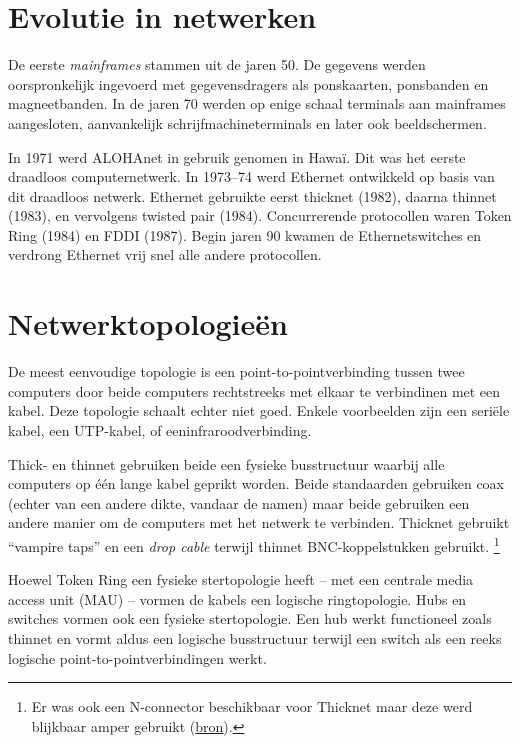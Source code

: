\section{Evolutie in netwerken}

De eerste \emph{mainframes} stammen uit de jaren 50.
De gegevens werden oorspronkelijk ingevoerd met gegevensdragers als ponskaarten, ponsbanden en magneetbanden.
In de jaren 70 werden op enige schaal terminals aan mainframes aangesloten, aanvankelijk schrijfmachineterminals en later ook beeldschermen.

In 1971 werd ALOHAnet in gebruik genomen in Hawaï.
Dit was het eerste draadloos computernetwerk.
In 1973--74 werd Ethernet ontwikkeld op basis van dit draadloos netwerk.
Ethernet gebruikte eerst thicknet (1982), daarna thinnet (1983), en vervolgens twisted pair (1984).
Concurrerende protocollen waren Token Ring (1984) en FDDI (1987).
Begin jaren 90 kwamen de Ethernetswitches en verdrong Ethernet vrij snel alle andere protocollen.



\section{Netwerktopologieën}

De meest eenvoudige topologie is een point-to-pointverbinding tussen twee computers door beide computers rechtstreeks met elkaar te verbindinen met een kabel.
Deze topologie schaalt echter niet goed.
Enkele voorbeelden zijn een seriële kabel, een UTP-kabel, of eeninfraroodverbinding.

Thick- en thinnet gebruiken beide een fysieke busstructuur waarbij alle computers op één lange kabel geprikt worden.
Beide standaarden gebruiken coax (echter van een andere dikte, vandaar de namen) maar beide gebruiken een andere manier om de computers met het netwerk te verbinden.
Thicknet gebruikt ``vampire taps'' en een \emph{drop cable} terwijl thinnet BNC-koppelstukken gebruikt.%
   \footnote{Er was ook een N-connector beschikbaar voor Thicknet maar deze werd blijkbaar amper gebruikt (\href{http://www.mattmillman.com/projects/10base5/}{bron}).}

Hoewel Token Ring een fysieke stertopologie heeft -- met een centrale media access unit (MAU) -- vormen de kabels een logische ringtopologie.
Hubs en switches vormen ook een fysieke stertopologie.
Een hub werkt functioneel zoals thinnet en vormt aldus een logische busstructuur terwijl een switch als een reeks logische point-to-pointverbindingen werkt.


